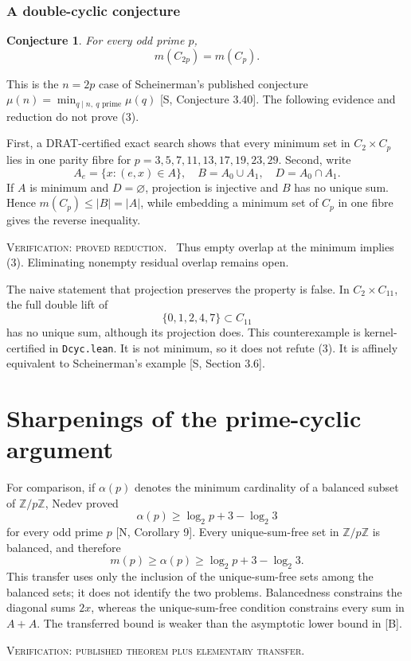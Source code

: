 \documentclass[10pt]{article}
\newcommand{\ZZ}{\mathbb Z}
\newcommand{\tier}[1]{\par\smallskip\noindent\textsc{Verification: #1.}\ }
\theoremstyle{plain}
\newtheorem*{conjecture}{Conjecture}
\begin{document}
\section{A double-cyclic conjecture}

\begin{conjecture}
For every odd prime $p$,
\[
                         m(C_{2p})=m(C_p).           \tag{3}
\]
\end{conjecture}
This is the $n=2p$ case of Scheinerman's published conjecture
$\mu(n)=\min_{q\mid n,\ q\text{ prime}}\mu(q)$ [S, Conjecture 3.40].
The following evidence and reduction do not prove (3).

First, a DRAT-certified exact search shows that every minimum set in
$C_2\times C_p$ lies in one parity fibre for
$p=3,5,7,11,13,17,19,23,29$. Second, write
\[
A_e=\{x:(e,x)\in A\},\quad B=A_0\cup A_1,\quad
D=A_0\cap A_1.
\]
If $A$ is minimum and $D=\varnothing$, projection is injective and $B$ has
no unique sum. Hence $m(C_p)\leq|B|=|A|$, while embedding a minimum set of
$C_p$ in one fibre gives the reverse inequality.
\tier{proved reduction}
Thus empty overlap at the minimum implies (3). Eliminating nonempty residual
overlap remains open.

The naive statement that projection preserves the property is false. In
$C_2\times C_{11}$, the full double lift of
\[
                 \{0,1,2,4,7\}\subset C_{11}
\]
has no unique sum, although its projection does. This counterexample is
kernel-certified in \texttt{Dcyc.lean}. It is not minimum, so it does not
refute (3). It is affinely equivalent to Scheinerman's example
[S, Section 3.6].

\part{Sharpenings of the prime-cyclic argument}

For comparison, if $\alpha(p)$ denotes the minimum cardinality of a balanced
subset of $\ZZ/p\ZZ$, Nedev proved
\[
             \alpha(p)\geq\log_2p+3-\log_2 3
\]
for every odd prime $p$ [N, Corollary 9]. Every unique-sum-free set in
$\ZZ/p\ZZ$ is balanced, and therefore
\[
             m(p)\geq\alpha(p)\geq\log_2p+3-\log_2 3.
\]
This transfer uses only the inclusion of the unique-sum-free sets among the
balanced sets; it does not identify the two problems. Balancedness constrains
the diagonal sums $2x$, whereas the unique-sum-free condition constrains every
sum in $A+A$. The transferred bound is weaker than the asymptotic lower bound
in [B].
\tier{published theorem plus elementary transfer}
\end{document}
